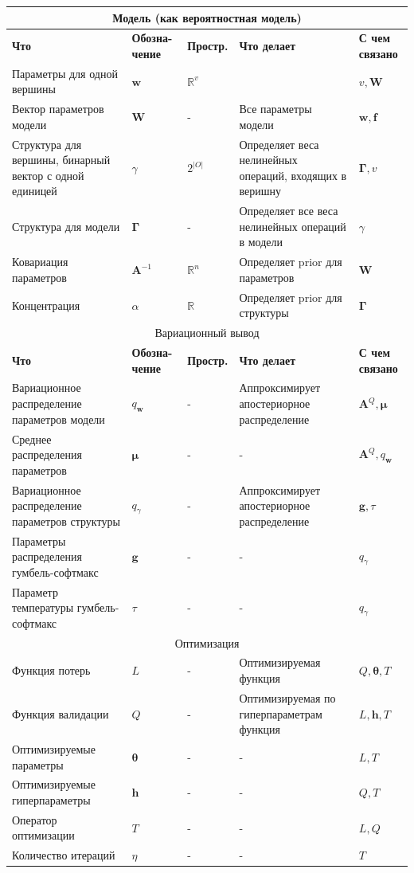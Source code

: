 \documentclass[12pt]{article}
\begin{document}
\begin{table}[tbh!]
\small
\begin{tabularx}{\textwidth}{|X|p{1.5cm}|p{1.5cm}|X|p{1.5cm}|}
\hline
\multicolumn{5}{c}{Модель (как вероятностная модель)}\\\hline
\bf Что & \bf Обозна- чение & \bf Простр. & \bf Что делает & \bf С чем связано  \\ \hline \hline
Параметры для одной вершины & $\mathbf{w}$ & $\mathbb{R}^{v}$ & & $v, \mathbf{W}$ \\ \hline 
Вектор параметров модели & $\mathbf{W}$ & - & Все параметры модели & $\mathbf{w}, \mathbf{f}$ \\ \hline
Структура для вершины, бинарный вектор с одной единицей & $\gamma$ & $2^{|O|}$ & Определяет веса нелинейных операций, входящих в веришну & $\boldsymbol{\Gamma}, v$ \\ \hline
Структура для модели & $\boldsymbol{\Gamma}$ & - & Определяет все веса нелинейных операций в модели & $\gamma$ \\ \hline
Ковариация параметров & $\mathbf{A}^{-1}$ & $\mathbb{R}^n$ & Определяет prior для параметров & $\mathbf{W}$ \\ \hline
Концентрация & $\alpha$  & $\mathbb{R}$ & Определяет prior для структуры & $\boldsymbol{\Gamma}$ \\ \hline
 
\multicolumn{5}{c}{Вариационный вывод}\\\hline
\bf Что & \bf Обозна- чение & \bf Простр. & \bf Что делает & \bf С чем связано  \\ \hline \hline
Вариационное распределение параметров модели & $q_\mathbf{w}$ &  - & Аппроксимирует апостериорное распределение & $\mathbf{A}^Q, \boldsymbol{\mu}$ \\ \hline
Среднее распределения параметров & $\boldsymbol{\mu}$ & - & - & $\mathbf{A}^Q, q_\mathbf{w}$ \\ \hline
Вариационное распределение параметров структуры & $q_\gamma$ & - & Аппроксимирует апостериорное распределение & $\mathbf{g}, \tau$ \\ \hline
Параметры распределения гумбель-софтмакс & $\mathbf{g}$ & - & - & $q_\gamma$ \\ \hline
Параметр температуры гумбель-софтмакс & $\tau$ & - & - & $q_\gamma$ \\ \hline

\multicolumn{5}{c}{Оптимизация}\\\hline
Функция потерь & $L$ &-& Оптимизируемая функция & $Q, \boldsymbol{\theta}, T$ \\ \hline 
Функция валидации & $Q$ & - & Оптимизируемая по гиперпараметрам функция & $L, \mathbf{h}, T$\\ \hline
Оптимизируемые параметры & $\boldsymbol{\theta}$ & - & - & $L, T$ \\ \hline
Оптимизируемые гиперпараметры & $\mathbf{h}$ & - & - &  $Q, T$ \\ \hline
Оператор оптимизации & $T$ & - & - &$L,Q$ \\ \hline
Количество итераций & $\eta$ & - & - & $T$ \\ \hline

\end{tabularx}

\end{table}
\end{document}
